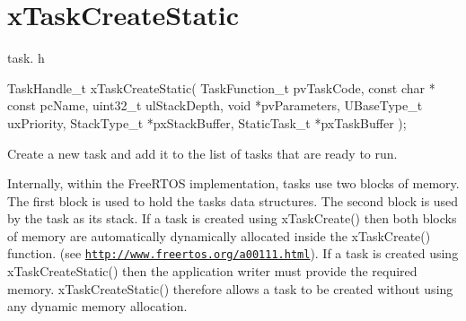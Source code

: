 \hypertarget{group__xTaskCreateStatic}{}\section{x\+Task\+Create\+Static}
\label{group__xTaskCreateStatic}
task. h 
\begin{DoxyPre}
TaskHandle\_t xTaskCreateStatic( TaskFunction\_t pvTaskCode,
                             const char * const pcName,
                             uint32\_t ulStackDepth,
                             void *pvParameters,
                             UBaseType\_t uxPriority,
                             StackType\_t *pxStackBuffer,
                             StaticTask\_t *pxTaskBuffer );\end{DoxyPre}


Create a new task and add it to the list of tasks that are ready to run.

Internally, within the Free\+R\+T\+OS implementation, tasks use two blocks of memory. The first block is used to hold the task\textquotesingle{}s data structures. The second block is used by the task as its stack. If a task is created using x\+Task\+Create() then both blocks of memory are automatically dynamically allocated inside the x\+Task\+Create() function. (see \href{http://www.freertos.org/a00111.html}{\tt http\+://www.\+freertos.\+org/a00111.\+html}). If a task is created using x\+Task\+Create\+Static() then the application writer must provide the required memory. x\+Task\+Create\+Static() therefore allows a task to be created without using any dynamic memory allocation.


